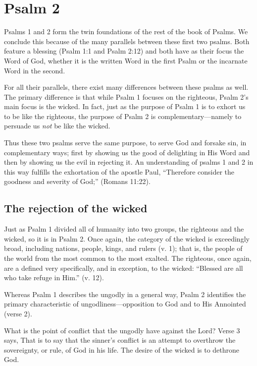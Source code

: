 \chapter{Psalm 2}
Psalms 1 and 2 form the twin foundations of the rest of the book of Psalms.
We conclude this because of the many parallels between these first two psalms.
Both feature a blessing (Psalm 1:1 and Psalm 2:12) and 
    both have as their focus the Word of God,
    whether it is the written Word in the first Psalm
    or the incarnate Word in the second.

For all their parallels, there exist many differences between these psalms as well.
The primary difference is that while Psalm 1 focuses on the righteous,
    Psalm 2's main focus is the wicked.
In fact, just as the purpose of Psalm 1 is to exhort us to be like the righteous,
    the purpose of Psalm 2 is complementary---namely
    to persuade us \emph{not} be like the wicked.

Thus these two psalms serve the same purpose, 
    to serve God and forsake sin,
    in complementary ways;
    first by showing us the good of delighting in His Word
    and then by showing us the evil in rejecting it.
An understanding of psalms 1 and 2 in this way fulfills
    the exhortation of the apostle Paul,
    ``Therefore consider the goodness and severity of God;''
    (Romans 11:22).

\section{The rejection of the wicked}
Just as Psalm 1 divided all of humanity into two groups,
    the righteous and the wicked, so it is in Psalm 2.
Once again, the category of the wicked is exceedingly broad,
    including nations, people, kings, and rulers (v. 1);
    that is, the people of the world from the most common to the most exalted.
The righteous, once again, are a defined very specifically, and in exception,
    to the wicked: ``Blessed are all who take refuge in Him.'' (v. 12).
    
Whereas Psalm 1 describes the ungodly in a general way,
    Psalm 2 identifies the primary characteristic of ungodliness---opposition
    to God and to His Annointed (verse 2).

What is the point of conflict that the ungodly have against the Lord?
Verse 3 says,
That is to say that the sinner's conflict is an attempt to
    overthrow the sovereignty, or rule, of God in his life.
The desire of the wicked is to dethrone God.

